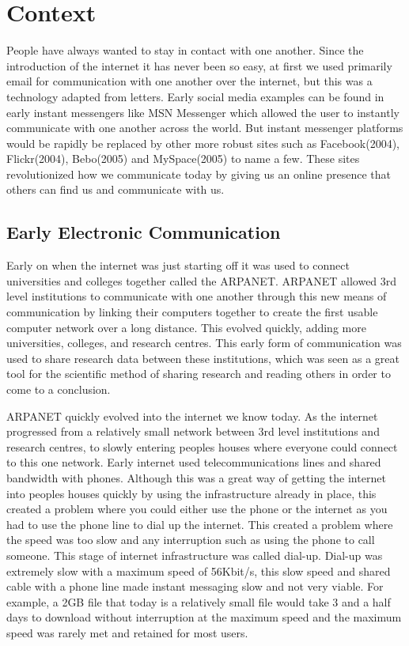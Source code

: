 \chapter{Context} \label{context}
People have always wanted to stay in contact with one another. Since the introduction of the internet it has never been so easy, at first we used primarily email for communication with one another over the internet, but this was a technology adapted from letters. Early social media examples can be found in early instant messengers like MSN Messenger which allowed the user to instantly communicate with one another across the world. But instant messenger platforms would be rapidly be replaced by other more robust sites such as Facebook(2004), Flickr(2004), Bebo(2005) and MySpace(2005) to name a few. These sites revolutionized how we communicate today by giving us an online presence that others can find us and communicate with us.

\section{Early Electronic Communication}
Early on when the internet was just starting off it was used to connect universities and colleges together called the ARPANET. ARPANET allowed 3rd level institutions to communicate with one another through this new means of communication by linking their computers together to create the first usable computer network over a long distance. This evolved quickly, adding more universities, colleges, and research centres. This early form of communication was used to share research data between these institutions, which was seen as a great tool for the scientific method of sharing research and reading others in order to come to a conclusion.

ARPANET quickly evolved into the internet we know today. As the internet progressed from a relatively small network between 3rd level institutions and research centres, to slowly entering peoples houses where everyone could connect to this one network. Early internet used telecommunications lines and shared bandwidth with phones. Although this was a great way of getting the internet into peoples houses quickly by using the infrastructure already in place, this created a problem where you could either use the phone or the internet as you had to use the phone line to dial up the internet. This created a problem where the speed was too slow and any interruption such as using the phone to call someone. This stage of internet infrastructure was called dial-up. Dial-up was extremely slow with a maximum speed of 56Kbit/s, this slow speed and shared cable with a phone line made instant messaging slow and not very viable. For example, a 2GB file that today is a relatively small file would take 3 and a half days to download without interruption at the maximum speed and the maximum speed was rarely met and retained for most users.

